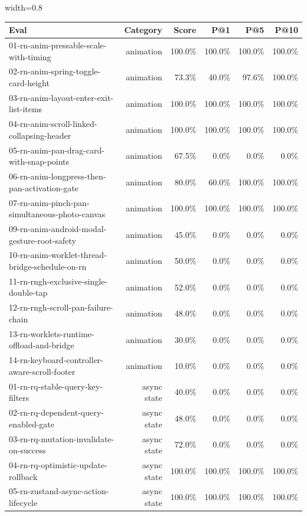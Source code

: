 \begin{table}[htbp]
\centering
\begin{adjustbox}{width=0.8\textwidth}
\begin{tabular}{lrrrrr}
\toprule
Eval & Category & Score & P@1 & P@5 & P@10 \\
\midrule
01-rn-anim-pressable-scale-with-timing & animation & 100.0\% & 100.0\% & 100.0\% & 100.0\% \\
02-rn-anim-spring-toggle-card-height & animation & 73.3\% & 40.0\% & 97.6\% & 100.0\% \\
03-rn-anim-layout-enter-exit-list-items & animation & 100.0\% & 100.0\% & 100.0\% & 100.0\% \\
04-rn-anim-scroll-linked-collapsing-header & animation & 100.0\% & 100.0\% & 100.0\% & 100.0\% \\
05-rn-anim-pan-drag-card-with-snap-points & animation & 67.5\% & 0.0\% & 0.0\% & 0.0\% \\
06-rn-anim-longpress-then-pan-activation-gate & animation & 80.0\% & 60.0\% & 100.0\% & 100.0\% \\
07-rn-anim-pinch-pan-simultaneous-photo-canvas & animation & 100.0\% & 100.0\% & 100.0\% & 100.0\% \\
09-rn-anim-android-modal-gesture-root-safety & animation & 45.0\% & 0.0\% & 0.0\% & 0.0\% \\
10-rn-anim-worklet-thread-bridge-schedule-on-rn & animation & 50.0\% & 0.0\% & 0.0\% & 0.0\% \\
11-rn-rngh-exclusive-single-double-tap & animation & 52.0\% & 0.0\% & 0.0\% & 0.0\% \\
12-rn-rngh-scroll-pan-failure-chain & animation & 48.0\% & 0.0\% & 0.0\% & 0.0\% \\
13-rn-worklets-runtime-offload-and-bridge & animation & 30.0\% & 0.0\% & 0.0\% & 0.0\% \\
14-rn-keyboard-controller-aware-scroll-footer & animation & 10.0\% & 0.0\% & 0.0\% & 0.0\% \\
01-rn-rq-stable-query-key-filters & async state & 40.0\% & 0.0\% & 0.0\% & 0.0\% \\
02-rn-rq-dependent-query-enabled-gate & async state & 48.0\% & 0.0\% & 0.0\% & 0.0\% \\
03-rn-rq-mutation-invalidate-on-success & async state & 72.0\% & 0.0\% & 0.0\% & 0.0\% \\
04-rn-rq-optimistic-update-rollback & async state & 100.0\% & 100.0\% & 100.0\% & 100.0\% \\
05-rn-zustand-async-action-lifecycle & async state & 100.0\% & 100.0\% & 100.0\% & 100.0\% \\

\end{tabular}
\end{adjustbox}
\end{table}
